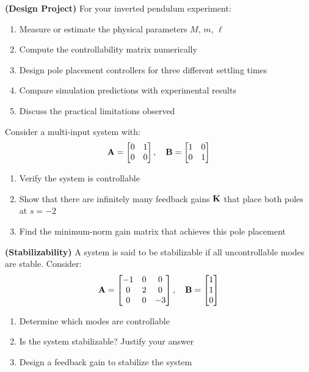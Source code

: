\begin{exercise}
\textbf{(Design Project)} For your inverted pendulum experiment:
\begin{enumerate}
\item Measure or estimate the physical parameters $M$, $m$, $\ell$
\item Compute the controllability matrix numerically
\item Design pole placement controllers for three different settling times
\item Compare simulation predictions with experimental results
\item Discuss the practical limitations observed
\end{enumerate}
\end{exercise}

\begin{exercise}
Consider a multi-input system with:
\begin{equation}
\mathbf{A} = \begin{bmatrix} 0 & 1 \\ 0 & 0 \end{bmatrix}, \quad
\mathbf{B} = \begin{bmatrix} 1 & 0 \\ 0 & 1 \end{bmatrix}
\end{equation}
\begin{enumerate}
\item Verify the system is controllable
\item Show that there are infinitely many feedback gains $\mathbf{K}$ that place both poles at $s = -2$
\item Find the minimum-norm gain matrix that achieves this pole placement
\end{enumerate}
\end{exercise}

\begin{exercise}
\textbf{(Stabilizability)} A system is said to be stabilizable if all uncontrollable modes are stable. Consider:
\begin{equation}
\mathbf{A} = \begin{bmatrix} -1 & 0 & 0 \\ 0 & 2 & 0 \\ 0 & 0 & -3 \end{bmatrix}, \quad
\mathbf{B} = \begin{bmatrix} 1 \\ 1 \\ 0 \end{bmatrix}
\end{equation}
\begin{enumerate}
\item Determine which modes are controllable
\item Is the system stabilizable? Justify your answer
\item Design a feedback gain to stabilize the system
\end{enumerate}
\end{exercise}

